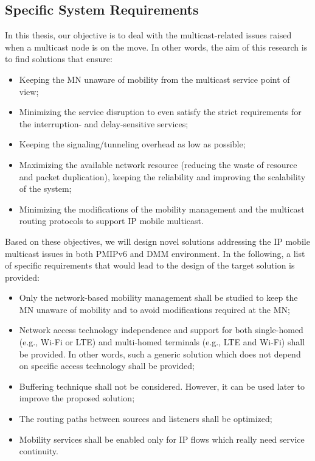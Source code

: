 \subsection{Specific System Requirements}
In this thesis, our objective is to deal with the multicast-related issues raised when a multicast node is on the move. In other words, the aim of this research is to find solutions that ensure:
\begin{itemize}
\item Keeping the MN unaware of mobility from the multicast service point of view;
\item Minimizing the service disruption to even satisfy the strict requirements for the interruption- and delay-sensitive services;
\item Keeping the signaling/tunneling overhead as low as possible;
\item Maximizing the available network resource (reducing the waste of resource and packet duplication), keeping the reliability and improving the scalability of the system;
\item Minimizing the modifications of the mobility management and the multicast routing protocols to support IP mobile multicast. 
\end{itemize}

Based on these objectives, we will design novel solutions addressing the IP mobile multicast issues in both PMIPv6 and DMM environment. In the following, a list of specific requirements that would lead to the design of the target solution is provided:
\begin{itemize}
\item Only the network-based mobility management shall be studied to keep the MN unaware of mobility and to avoid modifications required at the MN;
\item Network access technology independence and support for both single-homed (e.g., Wi-Fi or LTE) and multi-homed terminals (e.g., LTE and Wi-Fi) shall be provided. In other words, such a generic solution which does not depend on specific access technology shall be provided;
\item Buffering technique shall not be considered. However, it can be used later to improve the proposed solution;
\item The routing paths between sources and listeners shall be optimized;
\item Mobility services shall be enabled only for IP flows which really need service continuity.
\end{itemize}


